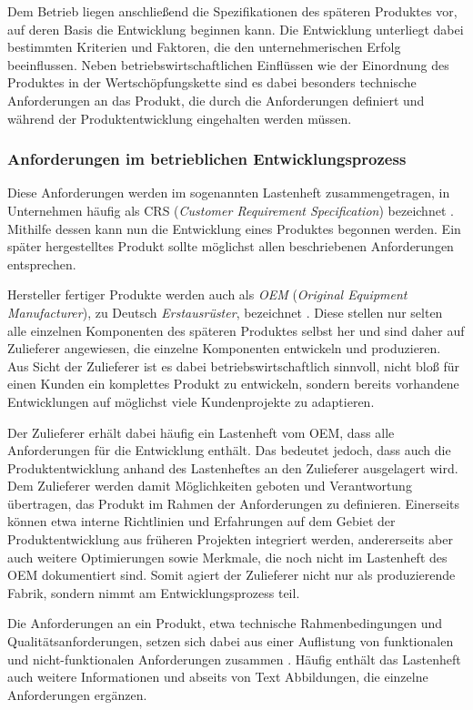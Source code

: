 \documentclass[12pt]{report}
\begin{document}
Dem Betrieb liegen anschließend die Spezifikationen des späteren Produktes vor, auf deren Basis die Entwicklung beginnen kann. Die Entwicklung unterliegt dabei bestimmten Kriterien und Faktoren, die den unternehmerischen Erfolg beeinflussen. Neben betriebswirtschaftlichen Einflüssen wie der Einordnung des Produktes in der Wertschöpfungskette sind es dabei besonders technische Anforderungen an das Produkt, die durch die Anforderungen definiert und während der Produktentwicklung eingehalten werden müssen.

\subsubsection{Anforderungen im betrieblichen Entwicklungsprozess}
Diese Anforderungen werden im sogenannten Lastenheft zusammengetragen, in Unternehmen häufig als CRS (\textit{Customer Requirement Specification}) bezeichnet \cite{dge19}. Mithilfe dessen kann nun die Entwicklung eines Produktes begonnen werden. Ein später hergestelltes Produkt sollte möglichst allen beschriebenen Anforderungen entsprechen. 

Hersteller fertiger Produkte werden auch als \textit{OEM} (\textit{Original Equipment Manufacturer}), zu Deutsch \textit{Erstausrüster}, bezeichnet \cite{ir09}. Diese stellen nur selten alle einzelnen Komponenten des späteren Produktes selbst her und sind daher auf Zulieferer angewiesen, die einzelne Komponenten entwickeln und produzieren. Aus Sicht der Zulieferer ist es dabei betriebswirtschaftlich sinnvoll, nicht bloß für einen Kunden ein komplettes Produkt zu entwickeln, sondern bereits vorhandene Entwicklungen auf möglichst viele Kundenprojekte zu adaptieren. 

Der Zulieferer erhält dabei häufig ein Lastenheft vom OEM, dass alle Anforderungen für die Entwicklung enthält. Das bedeutet jedoch, dass auch die Produktentwicklung anhand des Lastenheftes an den Zulieferer ausgelagert wird. Dem Zulieferer werden damit Möglichkeiten geboten und Verantwortung übertragen, das Produkt im Rahmen der Anforderungen zu definieren. Einerseits können etwa interne Richtlinien und Erfahrungen auf dem Gebiet der Produktentwicklung aus früheren Projekten integriert werden, andererseits aber auch weitere Optimierungen sowie Merkmale, die noch nicht im Lastenheft des OEM dokumentiert sind. Somit agiert der Zulieferer nicht nur als produzierende Fabrik, sondern nimmt am Entwicklungsprozess teil.

Die Anforderungen an ein Produkt, etwa technische Rahmenbedingungen und Qualitätsanforderungen, setzen sich dabei aus einer Auflistung von funktionalen und nicht-funktionalen Anforderungen zusammen \cite{bal10}. Häufig enthält das Lastenheft auch weitere Informationen und abseits von Text Abbildungen, die einzelne Anforderungen ergänzen. 
\end{document}

